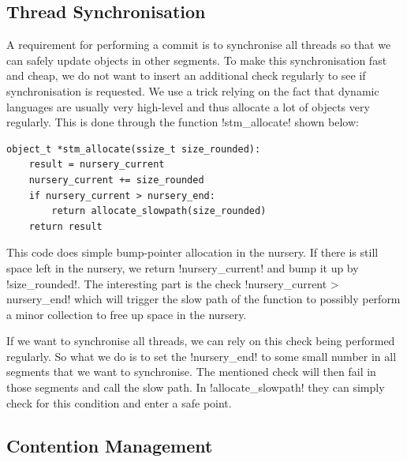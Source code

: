\documentclass{sigplanconf}
\makeatletter
\renewcommand\lstinline[1][]{%
  \Collectverb{\@@myverb}%
}
\def\@@myverb#1{%
    \begingroup
    \fboxsep=0.2em
    \colorbox{verylightgray}{\oldlstinline|#1|}%
    \endgroup
}
\makeatother
\begin{document}
\subsection{Thread Synchronisation}

A requirement for performing a commit is to synchronise all threads so
that we can safely update objects in other segments. To make this
synchronisation fast and cheap, we do not want to insert an additional
check regularly to see if synchronisation is requested. We
use a trick relying on the fact that dynamic languages are usually
very high-level and thus allocate a lot of objects very regularly.
This is done through the function \lstinline!stm_allocate!  shown
below:

\begin{lstlisting}
object_t *stm_allocate(ssize_t size_rounded):
    result = nursery_current
	nursery_current += size_rounded
	if nursery_current > nursery_end:
		return allocate_slowpath(size_rounded)
	return result
\end{lstlisting}


This code does simple bump-pointer allocation in the nursery. If there
is still space left in the nursery, we return
\lstinline!nursery_current!  and bump it up by
\lstinline!size_rounded!.  The interesting part is the check
\lstinline!nursery_current > nursery_end!  which will trigger the slow
path of the function to possibly perform a minor collection
to free up space in the nursery.

If we want to synchronise all threads, we can rely on this check being
performed regularly. So what we do is to set the
\lstinline!nursery_end!  to some small number in all segments that we
want to synchronise. The mentioned check will then fail in those
segments and call the slow path. In \lstinline!allocate_slowpath!
they can simply check for this condition and enter a safe point.



\subsection{Contention Management\label{subsub:contentionmanagement}}
\end{document}
